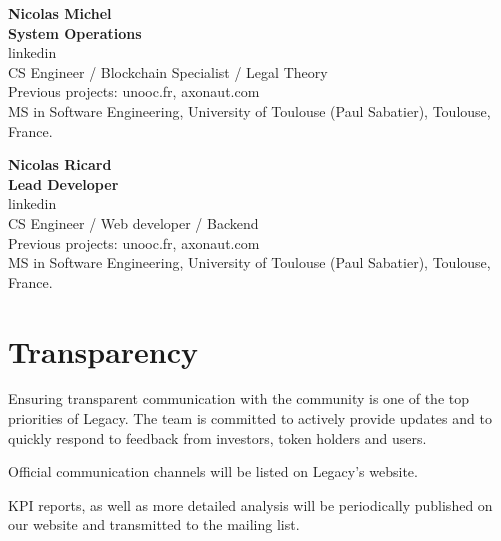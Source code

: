 \vspace{5mm} %
 
\noindent
\textbf{Nicolas Michel} \\
\textbf{System Operations} \\
linkedin \\
CS Engineer / Blockchain Specialist / Legal Theory \\
Previous projects: unooc.fr, axonaut.com \\
MS in Software Engineering, University of Toulouse (Paul Sabatier), Toulouse, France. \\

\vspace{5mm} %
 
\noindent 
\textbf{Nicolas Ricard} \\
\textbf{Lead Developer}  \\
linkedin \\
CS Engineer / Web developer / Backend \\
Previous projects: unooc.fr, axonaut.com \\
MS in Software Engineering, University of Toulouse (Paul Sabatier), Toulouse, France. \\

\section{Transparency} %
\label{sec:transparency}
Ensuring transparent communication with the community is one of the top priorities of Legacy. The team is committed to actively provide updates and to quickly respond to feedback from investors, token holders and users.

Official communication channels will be listed on Legacy’s website.

KPI reports, as well as more detailed analysis will be periodically published on our website and transmitted to the mailing list.


